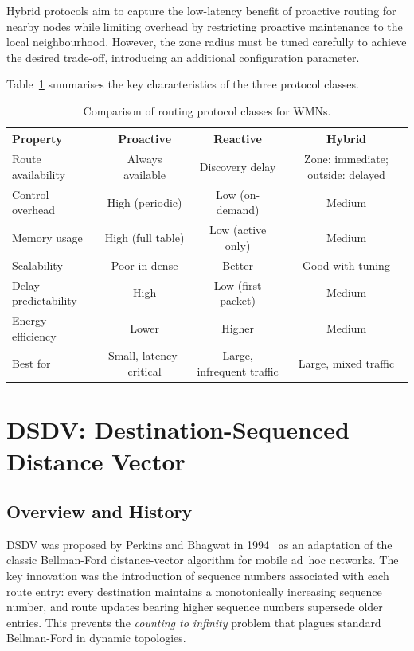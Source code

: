 Hybrid protocols aim to capture the low-latency benefit of proactive routing for nearby
nodes while limiting overhead by restricting proactive maintenance to the local
neighbourhood. However, the zone radius must be tuned carefully to achieve the desired
trade-off, introducing an additional configuration parameter.

Table~\ref{tab:protocol_classes} summarises the key characteristics of the three protocol
classes.

\begin{table}[ht]
\centering
\caption{Comparison of routing protocol classes for WMNs.}
\label{tab:protocol_classes}
\begin{tabular}{@{}lccc@{}}
\toprule
\textbf{Property} & \textbf{Proactive} & \textbf{Reactive} & \textbf{Hybrid} \\
\midrule
Route availability    & Always available & Discovery delay   & Zone: immediate; outside: delayed \\
Control overhead      & High (periodic)  & Low (on-demand)   & Medium \\
Memory usage          & High (full table)& Low (active only) & Medium \\
Scalability           & Poor in dense    & Better            & Good with tuning \\
Delay predictability  & High             & Low (first packet)& Medium \\
Energy efficiency     & Lower            & Higher            & Medium \\
Best for              & Small, latency-critical & Large, infrequent traffic & Large, mixed traffic \\
\bottomrule
\end{tabular}
\end{table}

\section{DSDV: Destination-Sequenced Distance Vector}

\subsection{Overview and History}

DSDV was proposed by Perkins and Bhagwat in 1994~\cite{perkins1994dsdv} as an
adaptation of the classic Bellman-Ford distance-vector algorithm for mobile ad~hoc
networks. The key innovation was the introduction of sequence numbers associated with
each route entry: every destination maintains a monotonically increasing sequence number,
and route updates bearing higher sequence numbers supersede older entries. This prevents
the \emph{counting to infinity} problem that plagues standard Bellman-Ford in dynamic
topologies.

